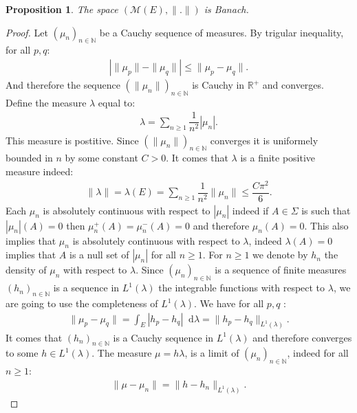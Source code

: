 \documentclass[11pt,a4paper]{article}
\newcommand{\RR}{\mathbb{R}}
\newcommand{\MC}{\mathcal{M}}
\newcommand{\Seq}[1]{\left(#1\right)_{n\in \mathbb{N}}}
\newcommand{\dd}{\mathop{}\!\mathrm{d}}
\newtheorem{proposition}[theorem]{Proposition}
\begin{document}
\begin{proposition}\label{prop:TV-banach}
    The space \(\left(\MC\left(E\right),\| .\|\right) \) is Banach.
\end{proposition}
\begin{proof}
    Let $\Seq{\mu_n}$ be a Cauchy sequence of measures. By trigular inequality, for all $p,q$:
    \begin{align*}
       \left| \|\mu_p\| - \|\mu_q\|\right| \leq \|\mu_p - \mu_q\|.
    \end{align*}
    And therefore the sequence $\Seq{\|\mu_n\|}$ is Cauchy in $\RR^+$ and converges. Define the measure $\lambda$ equal to:
    \begin{align*}
        \lambda = \sum\limits_{n \geq 1} \dfrac{1}{n^2} |\mu_n|.
    \end{align*}
   This measure is postitive. Since $\Seq{\|\mu_n\|}$ converges it is uniformely bounded in $n$ by some constant $C > 0$. It comes that $\lambda$ is a finite positive measure indeed:
    \begin{align*}
        \|\lambda\| = \lambda(E) = \sum\limits_{n \geq 1} \dfrac{1}{n^2}\|\mu_n\| \leq \dfrac{C\pi^2}{6}.
    \end{align*}
    Each $\mu_n$ is absolutely continuous with respect to $|\mu_n|$ indeed if $A \in \Sigma$ is such that $|\mu_n|(A) = 0$ then $\mu_n^+(A) = \mu_n^-(A) = 0$ and therefore $\mu_n(A)= 0$. This also implies that $\mu_n$ is absolutely continuous with respect to  $\lambda$, indeed $\lambda(A)= 0$ implies that $A$ is a null set of $|\mu_n|$ for all $n \geq 1$. For $n \geq 1$ we denote by $h_n$ the density of $\mu_n$ with respect to $\lambda$. Since $\Seq{\mu_n}$ is a sequence of finite measures $\Seq{h_n}$ is a sequence in $L^1(\lambda)$ the integrable functions with respect to $\lambda$, we are going to use the completeness of $L^1(\lambda)$. We have for all $p,q$ :
    \begin{align*}
        \| \mu_p - \mu_q \| = \int_{E} |h_p - h_q| \dd\lambda = \|h_p - h_q \|_{L^1(\lambda)}.
    \end{align*}
    It comes that $\Seq{h_n}$ is a Cauchy sequence in $L^1(\lambda)$ and therefore converges to some $h \in L^1(\lambda)$. The measure $\mu = h\lambda$, is a limit of $\Seq{\mu_n}$, indeed for all $n \geq 1$:
    \begin{align*}
        \|\mu - \mu_n\| = \|h - h_n\|_{L^1(\lambda)}.
    \end{align*}
\end{proof}
\end{document}

